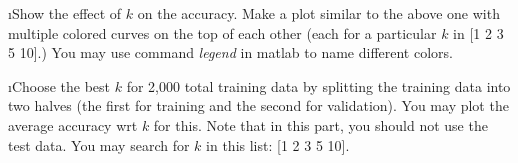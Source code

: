 \documentclass[fleqn]{article}
\begin{document}
\i Show the effect of $k$ on the accuracy. Make a plot similar to the above one with multiple colored curves on the top of each other (each for a particular $k$ in [1 2 3 5 10].) You may use command {\em legend} in matlab to name different colors.

\i Choose the best $k$ for 2,000 total training data by splitting the training data into two halves (the first for training and the second for validation). You may plot the average accuracy wrt $k$ for this. Note that in this part, you should not use the test data. You may search for $k$ in this list: [1 2 3 5 10].

\ene

\ene
\end{document}
